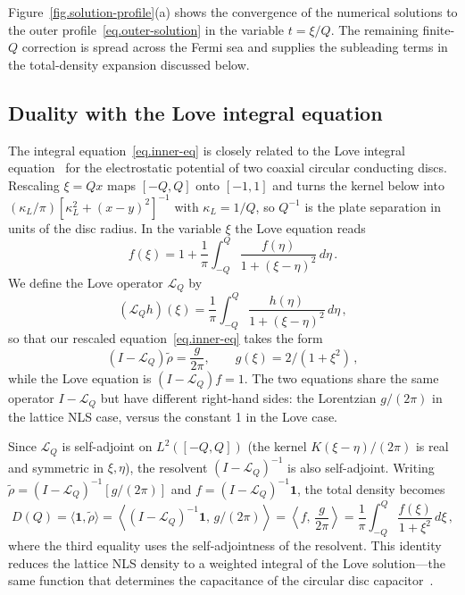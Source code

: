 \documentclass[11pt,a4paper]{article}
\theoremstyle{definition}
\begin{document}
Figure~\ref{fig.solution-profile}(a) shows the convergence of the numerical
solutions to the outer profile~\eqref{eq.outer-solution} in the variable
$t=\xi/Q$.  The remaining finite-$Q$ correction is spread across the Fermi sea
and supplies the subleading terms in the total-density expansion discussed
below.



\subsection{Duality with the Love integral equation}
\label{sec.duality-Love}

The integral equation~\eqref{eq.inner-eq} is closely related to the
Love integral equation~\cite{Love1949} for the electrostatic potential
of two coaxial circular conducting discs.  Rescaling $\xi = Qx$ maps
$[-Q,Q]$ onto $[-1,1]$ and turns the kernel below into
$(\kappa_L/\pi)\left[\kappa_L^2+(x-y)^2\right]^{-1}$ with $\kappa_L = 1/Q$, so
$Q^{-1}$ is the plate separation in units of the disc radius.  In the variable
$\xi$ the Love equation reads
\begin{equation}\label{eq.Love}
  f(\xi) = 1 + \frac{1}{\pi}\int_{-Q}^{Q}
  \frac{f(\eta)}{1 + (\xi - \eta)^2}\,d\eta\,.
\end{equation}
We define the Love operator $\mathcal{L}_Q$ by
\begin{equation}\label{eq.LQ-def}
    (\mathcal{L}_Q h)(\xi) = \frac{1}{\pi}\int_{-Q}^Q
\frac{h(\eta)}{1+(\xi-\eta)^2}\,d\eta \, ,
\end{equation}
so that our rescaled equation~\eqref{eq.inner-eq} takes the form
\begin{equation}\label{eq.lattice-love-form}
    (I - \mathcal{L}_Q)\tilde\rho = \frac{g}{2\pi}, \qquad 
g(\xi) = 2/(1+\xi^2)\, ,
\end{equation}
while the Love equation is $(I - \mathcal{L}_Q)f = 1$.
The two equations share the same operator $I - \mathcal{L}_Q$ but
have different right-hand sides: the Lorentzian $g/(2\pi)$
in the lattice NLS case, versus the constant 1 
in the Love case.

Since $\mathcal{L}_Q$ is self-adjoint on $L^2([-Q,Q])$ (the kernel
$K(\xi-\eta)/(2\pi)$ is real and symmetric in $\xi,\eta$), the
resolvent $(I - \mathcal{L}_Q)^{-1}$ is also self-adjoint.
Writing $\tilde\rho = (I - \mathcal{L}_Q)^{-1}[g/(2\pi)]$ and
$f = (I - \mathcal{L}_Q)^{-1}\mathbf{1}$, the total density becomes
\begin{equation}\label{eq.duality}
  D(Q)
  = \langle \mathbf{1}, \tilde\rho\rangle
  = \left\langle (I - \mathcal{L}_Q)^{-1}\mathbf{1},\,
      g/(2\pi)\right\rangle
  = \left\langle f,\,\frac{g}{2\pi}\right\rangle
  = \frac{1}{\pi}\int_{-Q}^{Q} \frac{f(\xi)}{1+\xi^2}\,d\xi\,,
\end{equation}
where the third equality uses the self-adjointness of the resolvent.
This identity reduces the lattice NLS density to a weighted integral of
the Love solution---the same function that determines the capacitance of
the circular disc capacitor~\cite{Love1949,FarinaLangMartin2022}.
\end{document}

